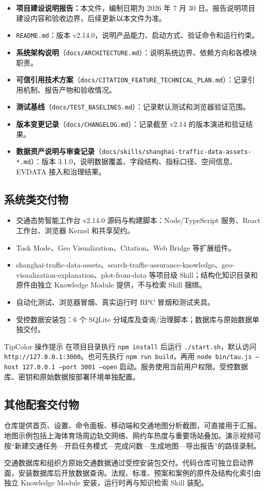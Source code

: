 \documentclass[a4paper,11pt]{article}
\newenvironment{tip}     {\begin{admonition}{TipColor}     {操作提示}}{\end{admonition}}
\newcommand{\code}[1]{\texttt{#1}}
\newcommand{\term}[1]{\textbf{#1}}
\begin{document}
\begin{itemize}
  \item \term{项目建设说明报告：}本文件，编制日期为 2026 年 7 月 30 日。报告说明项目建设内容和验收边界，后续更新以本文件为准。
  \item \code{README.md}：版本 v2.14.0，说明产品能力、启动方式、验证命令和运行约束。
  \item \term{系统架构说明}（\code{docs/ARCHITECTURE.md}）：说明系统边界、依赖方向和各模块职责。
  \item \term{可信引用技术方案}（\code{docs/CITATION\_FEATURE\_TECHNICAL\_PLAN.md}）：记录引用机制、报告产物和验收情况。
  \item \term{测试基线}（\code{docs/TEST\_BASELINES.md}）：记录默认测试和浏览器验证范围。
  \item \term{版本变更记录}（\code{docs/CHANGELOG.md}）：记录截至 v2.14 的版本演进和验证结果。
  \item \term{数据资产说明与审查记录}（\code{docs/skills/shanghai-traffic-data-assets-*.md}）：版本 3.1.0，说明数据覆盖、字段结构、指标口径、空间信息、EVDATA 接入和治理结果。
\end{itemize}

\subsection{系统类交付物}

\begin{itemize}
  \item 交通态势智能工作台 v2.14.0 源码与构建脚本：Node/TypeScript 服务、React 工作台、浏览器 Kernel 和共享契约。
  \item Task Mode、Geo Visualization、Citation、Web Bridge 等扩展组件。
  \item shanghai-traffic-data-assets、search-traffic-assurance-knowledge、geo-visualization-explanation、plot-from-data 等项目级 Skill；结构化知识目录和原件由独立 Knowledge Module 提供，不与检索 Skill 捆绑。
  \item 自动化测试、浏览器冒烟、真实运行时 RPC 冒烟和测试夹具。
  \item 受控数据安装包：6 个 SQLite 分域库及查询/治理脚本；数据库与原始数据单独交付。
\end{itemize}

\begin{tip}
在项目目录执行 \code{npm install} 后运行 \code{./start.sh}，默认访问 \code{http://127.0.0.1:3000}。也可先执行 \code{npm run build}，再用 \code{node bin/tau.js --host 127.0.0.1 --port 3001 --open} 启动。服务使用当前用户权限。受控数据库、密钥和原始数据按部署环境单独配置。
\end{tip}

\subsection{其他配套交付物}

仓库提供首页、设置、命令面板、移动端和交通地图分析截图，可直接用于汇报。地图示例包括上海体育场周边轨交网络、网约车热度与重要场站叠加。演示视频可按``新建交通任务—开启任务模式—完成问数—生成地图—导出报告''的路径录制。

交通数据库和组织方原始交通数据通过受控安装包交付。代码仓库可独立启动界面，安装数据库后开放数据查询。法规、标准、预案和案例的原件及结构化索引由独立 Knowledge Module 安装，运行时再与知识检索 Skill 装配。
\end{document}
